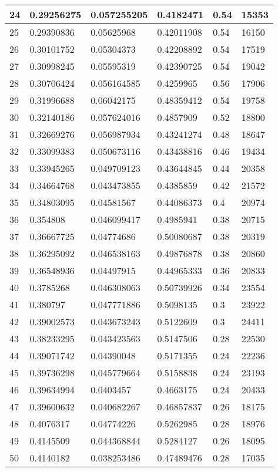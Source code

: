 \begin{longtable}{|l|l|l|l|l|l|}
24 & 0.29256275 & 0.057255205 & 0.4182471 & 0.54 & 15353 \\ \hline 
25 & 0.29390836 & 0.05625968 & 0.42011908 & 0.54 & 16150 \\ \hline 
26 & 0.30101752 & 0.05304373 & 0.42208892 & 0.54 & 17519 \\ \hline 
27 & 0.30998245 & 0.05595319 & 0.42390725 & 0.54 & 19042 \\ \hline 
28 & 0.30706424 & 0.056164585 & 0.4259965 & 0.56 & 17906 \\ \hline 
29 & 0.31996688 & 0.06042175 & 0.48359412 & 0.54 & 19758 \\ \hline 
30 & 0.32140186 & 0.057624016 & 0.4857909 & 0.52 & 18800 \\ \hline 
31 & 0.32669276 & 0.056987934 & 0.43241274 & 0.48 & 18647 \\ \hline 
32 & 0.33099383 & 0.050673116 & 0.43438816 & 0.46 & 19434 \\ \hline 
33 & 0.33945265 & 0.049709123 & 0.43644845 & 0.44 & 20358 \\ \hline 
34 & 0.34664768 & 0.043473855 & 0.4385859 & 0.42 & 21572 \\ \hline 
35 & 0.34803095 & 0.04581567 & 0.44086373 & 0.4 & 20974 \\ \hline 
36 & 0.354808 & 0.046099417 & 0.4985941 & 0.38 & 20715 \\ \hline 
37 & 0.36667725 & 0.04774686 & 0.50080687 & 0.38 & 20319 \\ \hline 
38 & 0.36295092 & 0.046538163 & 0.49876878 & 0.38 & 20860 \\ \hline 
39 & 0.36548936 & 0.04497915 & 0.44965333 & 0.36 & 20833 \\ \hline 
40 & 0.3785268 & 0.046308063 & 0.50739926 & 0.34 & 23554 \\ \hline 
41 & 0.380797 & 0.047771886 & 0.5098135 & 0.3 & 23922 \\ \hline 
42 & 0.39002573 & 0.043673243 & 0.5122609 & 0.3 & 24411 \\ \hline 
43 & 0.38233295 & 0.043423563 & 0.5147506 & 0.28 & 22530 \\ \hline 
44 & 0.39071742 & 0.04390048 & 0.5171355 & 0.24 & 22236 \\ \hline 
45 & 0.39736298 & 0.045779664 & 0.5158838 & 0.24 & 23193 \\ \hline 
46 & 0.39634994 & 0.0403457 & 0.4663175 & 0.24 & 20433 \\ \hline 
47 & 0.39600632 & 0.040682267 & 0.46857837 & 0.26 & 18175 \\ \hline 
48 & 0.4076317 & 0.04774226 & 0.5262985 & 0.28 & 18976 \\ \hline 
49 & 0.4145509 & 0.044368844 & 0.5284127 & 0.26 & 18095 \\ \hline 
50 & 0.4140182 & 0.038253486 & 0.47489476 & 0.28 & 17035 \\ \hline 
\end{longtable}